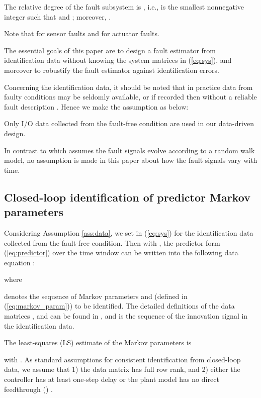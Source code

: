 \documentclass[twocolumn]{autart}
\begin{document}
\vspace*{-0.5cm}


\begin{assum}\label{ass:fault_rank}
	The relative degree of the fault subsystem  is , i.e.,  is the smallest nonnegative integer  such that  and  \cite{Kirt2011}; moreover, 
	 \cite{Dong2012c}.
\end{assum}
Note that  for sensor faults and  for actuator faults.






The essential goals of this paper are to design a fault estimator from identification data without knowing the system matrices in (\ref{eq:sys}), and moreover to robustify the fault estimator against identification errors.

Concerning the identification data, it should be noted that in practice data from faulty conditions may be seldomly available, or if recorded then without a reliable fault description \cite{Ding2014JPC}. Hence we make the assumption as below:
\begin{assum}\label{ass:data}
Only I/O data collected from the fault-free condition are used in our data-driven design.
\end{assum}

In contrast to \cite{Park2000} which assumes the fault signals  evolve according to a random walk model, no assumption is made in this paper about how the fault signals  vary with time.


\subsection{Closed-loop identification of predictor Markov parameters}\label{sect:IDmarkov}
Considering Assumption \ref{ass:data}, we set  in (\ref{eq:sys}) for the identification data collected from the fault-free condition.
Then with , the predictor form (\ref{eq:predictor}) over the time window  can be written into the following data equation \cite{Chiuso2007a, Veen2012}:

where

denotes the sequence of Markov parameters  and  (defined in (\ref{eq:markov_param})) to be identified. 
The detailed definitions of the data matrices ,  and  can be found in \cite{Veen2012}, and  is the sequence of the innovation signal in the identification data. 


The least-squares (LS) estimate of the Markov parameters  is

with .
As standard assumptions for consistent identification from closed-loop data, we assume that 1) the data matrix  has full row rank, and 2) either the controller has at least one-step delay or the plant model has no direct feedthrough () \cite{Chiuso2007a, Veen2012}.
\end{document}

